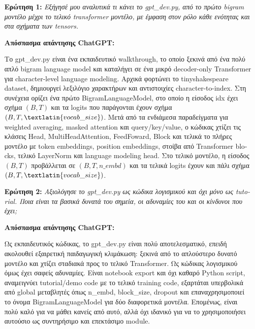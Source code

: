 \documentclass[11pt,a4paper]{article}
\begin{document}
\textbf{Ερώτηση 1:} \emph{Εξήγησέ μου αναλυτικά τι κάνει το \textlatin{gpt\_dev.py}, από το πρώτο \textlatin{bigram}
μοντέλο μέχρι το τελικό \textlatin{transformer} μοντέλο, με έμφαση στον ρόλο κάθε ενότητας και στα σχήματα των \textlatin{tensors}.}

\textbf{Απόσπασμα απάντησης \textlatin{ChatGPT}:}

Το \textlatin{gpt\_dev.py} είναι ένα εκπαιδευτικό \textlatin{walkthrough}, το οποίο ξεκινά από ένα πολύ απλό
\textlatin{bigram language model} και καταλήγει σε ένα μικρό \textlatin{decoder-only Transformer} για
\textlatin{character-level language modeling}. Αρχικά φορτώνει το \textlatin{tinyshakespeare} dataset,
δημιουργεί λεξιλόγιο χαρακτήρων και αντιστοιχίες \textlatin{character-to-index}. Στη συνέχεια ορίζει ένα πρώτο
\textlatin{BigramLanguageModel}, στο οποίο η είσοδος \textlatin{idx} έχει σχήμα $(B,T)$ και τα \textlatin{logits}
που παράγονται έχουν σχήμα $(B,T,\textlatin{vocab\_size})$. Μετά από τα ενδιάμεσα παραδείγματα για
\textlatin{weighted averaging}, \textlatin{masked attention} και \textlatin{query/key/value}, ο κώδικας χτίζει τις
κλάσεις \textlatin{Head}, \textlatin{MultiHeadAttention}, \textlatin{FeedFoward}, \textlatin{Block} και τελικά
το πλήρες μοντέλο με \textlatin{token embeddings}, \textlatin{position embeddings}, στοίβα από
\textlatin{Transformer blocks}, τελικό \textlatin{LayerNorm} και \textlatin{language modeling head}. Στο τελικό
μοντέλο, η είσοδος $(B,T)$ προβάλλεται σε $(B,T,n\_embd)$ και τα τελικά \textlatin{logits} έχουν και πάλι σχήμα
$(B,T,\textlatin{vocab\_size})$.

\textbf{Ερώτηση 2:} \emph{Αξιολόγησε το \textlatin{gpt\_dev.py} ως κώδικα λογισμικού και όχι μόνο ως \textlatin{tutorial}.
Ποια είναι τα βασικά δυνατά του σημεία, οι αδυναμίες του και οι κίνδυνοι που έχει;}

\textbf{Απόσπασμα απάντησης \textlatin{ChatGPT}:}

Ως εκπαιδευτικός κώδικας, το \textlatin{gpt\_dev.py} είναι πολύ αποτελεσματικό, επειδή ακολουθεί εξαιρετική
παιδαγωγική κλιμάκωση: ξεκινά από το απλούστερο δυνατό μοντέλο και χτίζει σταδιακά προς το τελικό
\textlatin{Transformer}. Ως κώδικας λογισμικού όμως έχει σαφείς αδυναμίες. Είναι \textlatin{notebook export} και όχι
καθαρό \textlatin{Python script}, αναμειγνύει \textlatin{tutorial/demo code} με το τελικό \textlatin{training code},
εξαρτάται υπερβολικά από global μεταβλητές όπως \textlatin{n\_embd}, \textlatin{block\_size}, \textlatin{dropout}
και επαναχρησιμοποιεί το όνομα \textlatin{BigramLanguageModel} για δύο διαφορετικά μοντέλα. Επομένως, είναι πολύ
καλό για να μάθει κανείς από αυτό, αλλά όχι ιδανικό για να το χρησιμοποιήσει αυτούσιο ως συντηρήσιμο και επεκτάσιμο
\textlatin{module}.
\end{document}
